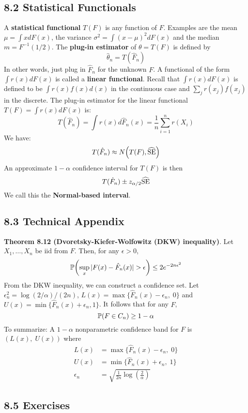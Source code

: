 \subsection*{8.2 Statistical
Functionals}\label{statistical-functionals}
A \textbf{statistical functional} \(T(F)\) is any function of \(F\).
Examples are the mean \(\mu = \int x dF(x)\), the variance
\(\sigma^{2} = \int (x - \mu)^{2} dF(x)\) and the median
\(m = F^{-1}(1/2)\).
The \textbf{plug-in estimator} of \(\theta = T(F)\) is defined by
\[
\hat{\theta}_{n} = T(\hat{F}_{n})
\]
In other words, just plug in \(\hat{F}_{n}\) for the unknown \(F\).
A functional of the form \(\int r(x) dF(x)\) is called a \textbf{linear
functional}. Recall that \(\int r(x) dF(x)\) is defined to be
\(\int r(x) f(x) d(x)\) in the continuous case and
\(\sum_{j} r(x_{j}) f(x_{j})\) in the discrete.
The plug-in estimator for the linear functional
\(T(F) = \int r(x) dF(x)\) is:
\[
T(\hat{F}_{n}) = \int r(x) d\hat{F}_{n}(x) = \frac{1}{n} \sum_{i=1}^{n} r(X_{i})
\]
We have:
\[
T(\hat{F}_{n}) \approx N\left(T(F), \widehat{\SE}\right)
\]
An approximate \(1 - \alpha\) confidence interval for \(T(F)\) is then
\[
T(\hat{F}_{n}) \pm z_{\alpha/2} \widehat{\operatorname{\mathrm{SE}}}
\]
We call this the \textbf{Normal-based interval}.

\subsection*{8.3 Technical Appendix}

\textbf{Theorem 8.12 (Dvoretsky-Kiefer-Wolfowitz (DKW) inequality)}. Let
\(X_{1}, \dots, X_{n}\) be iid from \(F\). Then, for any \(\epsilon > 0\),
\[
\PROB\left( \sup_x |F(x) - \hat{F}_{n}(x) | > \epsilon \right) \leq 2 e^{-2n\epsilon^{2}}
\]
From the DKW inequality, we can construct a confidence set. Let
\(\epsilon_{n}^{2} = \log(2/\alpha) / (2n)\),
\(L(x) = \max \{ \hat{F}_{n}(x) - \epsilon_{n}, \; 0 \}\) and
\(U(x) = \min \{\hat{F}_{n}(x) + \epsilon_{n}, 1 \}\). It follows that for
any \(F\),
\[
\operatorname{\mathbb{P}}(F \in C_{n}) \geq 1 - \alpha
\]
To summarize: A \(1 - \alpha\) nonparametric confidence band for \(F\) is \((L(x), \; U(x))\) where
\begin{align*}
L(x) &= \max \{ \hat{F}_{n}(x) - \epsilon_{n}, \; 0 \} \\
U(x) &= \min \{ \hat{F}_{n}(x) + \epsilon_{n}, \; 1 \} \\
\epsilon_{n} &= \sqrt{\frac{1}{2n} \log \left( \frac{2}{\alpha} \right) }
\end{align*}

\subsection*{8.5 Exercises}

